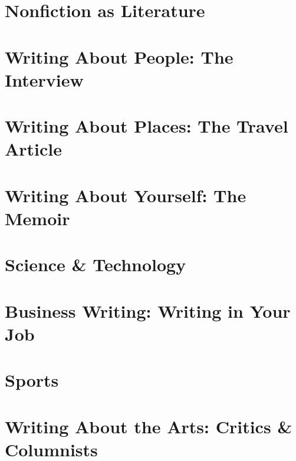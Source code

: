 \documentclass{article}
\begin{document}
\section{Nonfiction as Literature}


\section{Writing About People: The Interview}


\section{Writing About Places: The Travel Article}


\section{Writing About Yourself: The Memoir}


\section{Science \& Technology}


\section{Business Writing: Writing in Your Job}


\section{Sports}


\section{Writing About the Arts: Critics \& Columnists}
\end{document}

